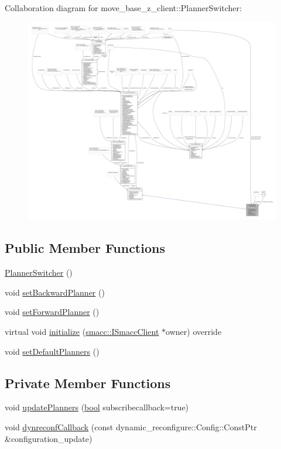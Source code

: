 Collaboration diagram for move\+\_\+base\+\_\+z\+\_\+client\+:\+:Planner\+Switcher\+:
\nopagebreak
\begin{figure}[H]
\begin{center}
\leavevmode
\includegraphics[width=350pt]{classmove__base__z__client_1_1PlannerSwitcher__coll__graph}
\end{center}
\end{figure}
\subsection*{Public Member Functions}
\begin{DoxyCompactItemize}
\item 
\hyperlink{classmove__base__z__client_1_1PlannerSwitcher_a41d7aaa9ae9a94fde424b3997e67f0a8}{Planner\+Switcher} ()
\item 
void \hyperlink{classmove__base__z__client_1_1PlannerSwitcher_a7688616d66fbfe6486c0cbe77e688114}{set\+Backward\+Planner} ()
\item 
void \hyperlink{classmove__base__z__client_1_1PlannerSwitcher_a4797022f304538949a2019b351ec47a8}{set\+Forward\+Planner} ()
\item 
virtual void \hyperlink{classmove__base__z__client_1_1PlannerSwitcher_a6eb5949d2402337291fdc4aaeda2ef87}{initialize} (\hyperlink{classsmacc_1_1ISmaccClient}{smacc\+::\+I\+Smacc\+Client} $\ast$owner) override
\item 
void \hyperlink{classmove__base__z__client_1_1PlannerSwitcher_aa31306368ab2a5145c024c0c1a580547}{set\+Default\+Planners} ()
\end{DoxyCompactItemize}
\subsection*{Private Member Functions}
\begin{DoxyCompactItemize}
\item 
void \hyperlink{classmove__base__z__client_1_1PlannerSwitcher_a189ac8c027169a111c7d8e14d864752f}{update\+Planners} (\hyperlink{classbool}{bool} subscribecallback=true)
\item 
void \hyperlink{classmove__base__z__client_1_1PlannerSwitcher_a7eacfedc6b6ea404ee8fab062d62a911}{dynreconf\+Callback} (const dynamic\+\_\+reconfigure\+::\+Config\+::\+Const\+Ptr \&configuration\+\_\+update)
\end{DoxyCompactItemize}
